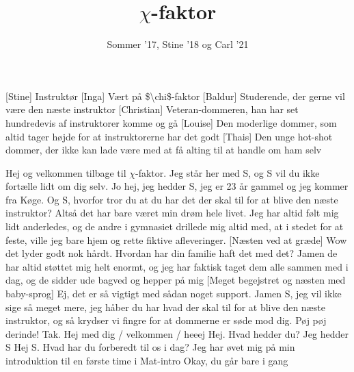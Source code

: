 \documentclass[a4paper,11pt]{article}
\title{$\chi$-faktor}
\author{Sommer '17, Stine '18 og Carl '21}
\begin{document}
\maketitle

\begin{roles}
[Stine] Instruktør
[Inga] Vært på \$\textbackslash{}chi\$-faktor
[Baldur] Studerende, der gerne vil være den næste instruktor
[Christian] Veteran-dommeren, han har set hundredevis af instruktorer komme og gå
[Louise] Den moderlige dommer, som altid tager højde for at instruktorerne har det godt
[Thais] Den unge hot-shot dommer, der ikke kan lade være med at få alting til at handle om ham selv
\end{roles}

\begin{sketch}
 Hej og velkommen tilbage til $\chi$-faktor. Jeg står her med S, og S vil du ikke fortælle lidt om dig selv.
 Jo hej, jeg hedder S, jeg er 23 år gammel og jeg kommer fra Køge.
 Og S, hvorfor tror du at du har det der skal til for at blive den næste instruktor?
 Altså det har bare været min drøm hele livet. Jeg har altid følt mig lidt anderledes, og de andre i gymnasiet drillede mig altid med, at i stedet for at feste, ville jeg bare hjem og rette fiktive afleveringer.
[Næsten ved at græde] Wow det lyder godt nok hårdt. Hvordan har din familie haft det med det?
 Jamen de har altid støttet mig helt enormt, og jeg har faktisk taget dem alle sammen med i dag, og de sidder ude bagved og hepper på mig
[Meget begejstret og næsten med baby-sprog] Ej, det er så vigtigt med sådan noget support. Jamen S, jeg vil ikke sige så meget mere, jeg håber du har hvad der skal til for at blive den næste instruktor, og så krydser vi fingre for at dommerne er søde mod dig. Pøj pøj derinde!
 Tak.
  Hej med dig / velkommen / heeej
 Hej.
 Hvad hedder du?
 Jeg hedder S
 Hej S. Hvad har du forberedt til os i dag?
 Jeg har øvet mig på min introduktion til en første time i Mat-intro
 Okay, du går bare i gang

\end{sketch}
\end{document}
